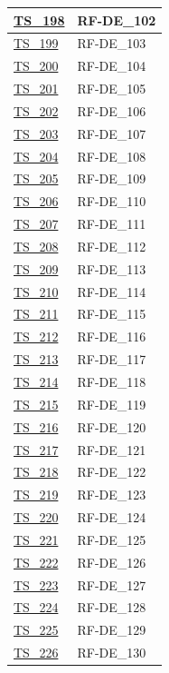 \begin{longtable}{|
		>{\raggedright\arraybackslash}p{} |
		>{\centering\arraybackslash}p{} |
	}
	\hyperlink{ts-198}{TS\_198} & RF-DE\_102 \\ \hline
	\hyperlink{ts-199}{TS\_199} & RF-DE\_103 \\ \hline
	\hyperlink{ts-200}{TS\_200} & RF-DE\_104 \\ \hline
	\hyperlink{ts-201}{TS\_201} & RF-DE\_105 \\ \hline
	\hyperlink{ts-202}{TS\_202} & RF-DE\_106 \\ \hline
	\hyperlink{ts-203}{TS\_203} & RF-DE\_107 \\ \hline
	\hyperlink{ts-204}{TS\_204} & RF-DE\_108 \\ \hline
	\hyperlink{ts-205}{TS\_205} & RF-DE\_109 \\ \hline
	\hyperlink{ts-206}{TS\_206} & RF-DE\_110 \\ \hline
	\hyperlink{ts-207}{TS\_207} & RF-DE\_111 \\ \hline
	\hyperlink{ts-208}{TS\_208} & RF-DE\_112 \\ \hline
	\hyperlink{ts-209}{TS\_209} & RF-DE\_113 \\ \hline
	\hyperlink{ts-210}{TS\_210} & RF-DE\_114 \\ \hline
	\hyperlink{ts-211}{TS\_211} & RF-DE\_115 \\ \hline
	\hyperlink{ts-212}{TS\_212} & RF-DE\_116 \\ \hline
	\hyperlink{ts-213}{TS\_213} & RF-DE\_117 \\ \hline
	\hyperlink{ts-214}{TS\_214} & RF-DE\_118 \\ \hline
	\hyperlink{ts-215}{TS\_215} & RF-DE\_119 \\ \hline
	\hyperlink{ts-216}{TS\_216} & RF-DE\_120 \\ \hline
	\hyperlink{ts-217}{TS\_217} & RF-DE\_121 \\ \hline
	\hyperlink{ts-218}{TS\_218} & RF-DE\_122 \\ \hline
	\hyperlink{ts-219}{TS\_219} & RF-DE\_123 \\ \hline
	\hyperlink{ts-220}{TS\_220} & RF-DE\_124 \\ \hline
	\hyperlink{ts-221}{TS\_221} & RF-DE\_125 \\ \hline
	\hyperlink{ts-222}{TS\_222} & RF-DE\_126 \\ \hline
	\hyperlink{ts-223}{TS\_223} & RF-DE\_127 \\ \hline
	\hyperlink{ts-224}{TS\_224} & RF-DE\_128 \\ \hline
	\hyperlink{ts-225}{TS\_225} & RF-DE\_129 \\ \hline
	\hyperlink{ts-226}{TS\_226} & RF-DE\_130 \\ \hline

\end{longtable}
